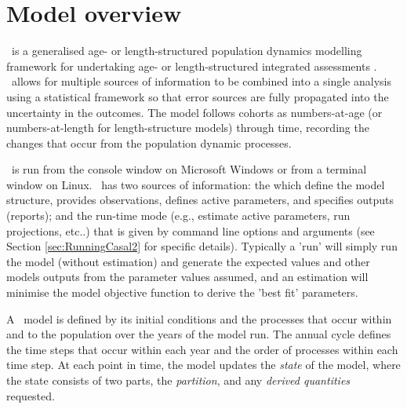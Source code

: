 \section{Model overview\label{sec:Overview}}

\CNAME\ is a generalised age- or length-structured population dynamics modelling framework for undertaking age- or length-structured integrated assessments \citep{Maunder_2013}. \CNAME\ allows for multiple sources of information to be combined into a single analysis using a statistical framework so that error sources are fully propagated into the uncertainty in the outcomes. The model follows cohorts as numbers-at-age (or numbers-at-length for length-structure models) through time, recording the changes that occur from the population dynamic processes.

\CNAME\ is run from the console window on Microsoft Windows or from a terminal window on Linux. \CNAME\ has two sources of information: the \emph{\config} which  define the model structure, provides observations, defines active parameters, and specifies outputs (reports); and the run-time mode (e.g., estimate active parameters, run projections, etc..) that is given by command line options and arguments (see Section \ref{sec:RunningCasal2} for specific details). Typically a 'run' will simply run the model (without estimation) and generate the expected values and other models outputs from the parameter values assumed, and an estimation will minimise the model objective function to derive the 'best fit' parameters.

A \CNAME\ model is defined by its initial conditions and the processes that occur within and to the population over the years of the model run. The annual cycle defines the time steps that occur within each year and the order of processes within each time step. At each point in time, the model updates the \emph{state} of the model, where the state consists of two parts, the \emph{partition}, and any \emph{derived quantities} requested.

